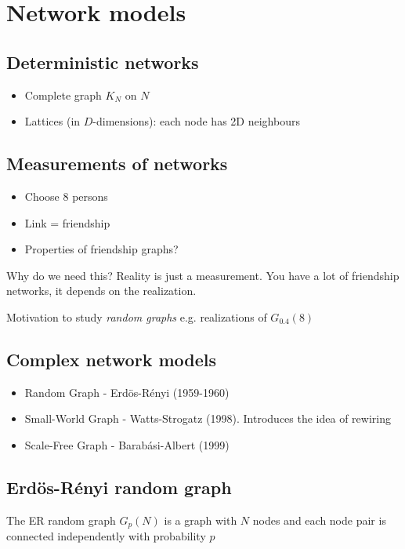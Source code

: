 
\section{Network models}

\subsection{Deterministic networks}

\begin{itemize}
  \item Complete graph $K_N$ on $N$
  \item Lattices (in $D$-dimensions): each node has 2D neighbours
\end{itemize}

\subsection{Measurements of networks}

\begin{itemize}
  \item Choose 8 persons
  \item Link = friendship
  \item Properties of friendship graphs?
\end{itemize}

Why do we need this? Reality is just a measurement. You have a lot of friendship networks,
it depends on the realization. 

Motivation to study \emph{random graphs}
e.g. realizations of $G_{0.4}(8)$

\subsection{Complex network models}

\begin{itemize}
  \item Random Graph - Erdös-Rényi (1959-1960)
  \item Small-World Graph - Watts-Strogatz (1998). Introduces the idea of rewiring
  \item Scale-Free Graph - Barabási-Albert (1999)
\end{itemize}

\subsection{Erdös-Rényi random graph}
The ER random graph $G_p(N)$ is a graph with $N$ nodes and each node pair is connected 
independently with probability $p$

